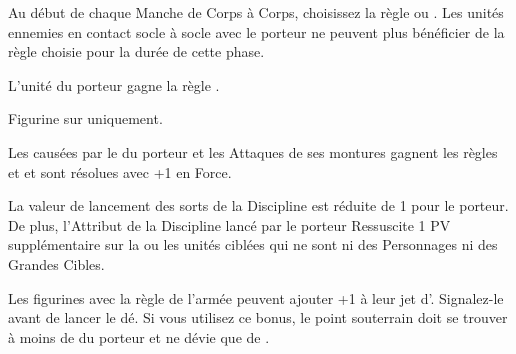\endpricelist

\armyenchanteditems

\startpricelist

 Au début de chaque Manche de Corps à Corps, choisissez la règle \inspiringpresence{} ou \holdyourground{}. Les unités ennemies en contact socle à socle avec le porteur ne peuvent plus bénéficier de la règle choisie pour la durée de cette phase.

 L'unité du porteur gagne la règle \hardtarget{}.

 Figurine sur \chariot{} uniquement.

Les \impacthits{} causées par le \chariot{} du porteur et les Attaques de ses montures gagnent les règles \flamingattacks{} et \magicalattacks{} et sont résolues avec +1 en Force.

\endpricelist

\armyarcaneitems

\startpricelist

 La valeur de lancement des sorts de la Discipline \sands{} est réduite de 1 pour le porteur. De plus, l'Attribut de la Discipline \sands{} lancé par le porteur Ressuscite 1 PV supplémentaire sur la ou les unités ciblées qui ne sont ni des Personnages ni des Grandes Cibles.

\endpricelist

\armymagicalbanners

\startpricelist

 Les figurines avec la règle \undergroundambush{} de l'armée peuvent ajouter +1 à leur jet d'\ambush{}. Signalez-le avant de lancer le dé. Si vous utilisez ce bonus, le point souterrain doit se trouver à moins de  du porteur et ne dévie que de .

\endpricelist

\closearmymagicalitems













\quickrefsheettitle

